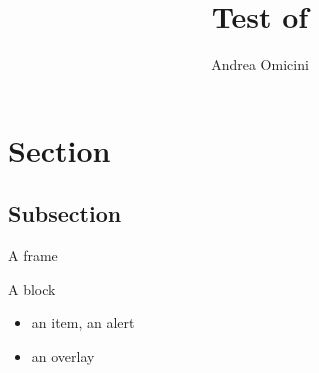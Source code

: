 \documentclass{beamer}
\title{Test of \cesenatheme}
\author{Andrea Omicini}
\institute{Alma Mater Studiorum—Università di Bologna}
\date{}
\begin{document}
\frame{\titlepage}
\section{Section}
\subsection{Subsection}
\begin{frame}{A frame}
  \begin{block}{A block}
    \begin{itemize}
      \item an item, \alert{an alert}
      \item<2-> an overlay
    \end{itemize}
  \end{block}
\end{frame}
\end{document}
